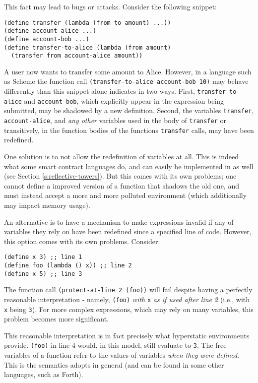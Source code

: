 This fact may lead to bugs or attacks. Consider the following snippet:

\begin{verbatim}
(define transfer (lambda (from to amount) ...))
(define account-alice ...)
(define account-bob ...)
(define transfer-to-alice (lambda (from amount)
  (transfer from account-alice amount))
\end{verbatim}

A user now wants to transfer some amount to Alice. However, in a language such
as Scheme the function call \texttt{(transfer-to-alice account-bob 10)} may
behave differently than this snippet alone indicates in two ways. First,
\texttt{transfer-to-alice} and \texttt{account-bob}, which explicitly appear in
the expression being submitted, may be shadowed by a new definition. Second,
the variables \texttt{transfer}, \texttt{account-alice}, and \emph{any other}
variables used in the body of \texttt{transfer} or transitively, in the
function bodies of the functions \texttt{transfer} calls, may have been
redefined.

One solution is to not allow the redefinition of variables at all. This is
indeed what some smart contract languages do, and can easily be implemented in \rad
as well (see Section \ref{s:reflective-towers}). But this comes with its own
problems; one cannot define a improved version of a function that shadows the
old one, and must instead accept a more and more polluted environment (which
additionally may impact memory usage).

An alternative is to have a mechanism to make expressions invalid if any of
variables they rely on have been redefined since a specified line of code.
However, this option comes with its own problems. Consider:

\begin{verbatim}
(define x 3) ;; line 1
(define foo (lambda () x)) ;; line 2
(define x 5) ;; line 3
\end{verbatim}

The function call \texttt{(protect-at-line 2 (foo))} will fail despite having a
perfectly reasonable interpretation - namely, \texttt{(foo)} \emph{with}
\texttt{x} \emph{as if used after line 2} (i.e., with \texttt{x} being
\texttt{3}). For more complex expressions, which may rely on many variables,
this problem becomes more significant.

This reasonable interpretation is in fact precisely what hyperstatic
environments provide. \texttt{(foo)} in line 4 would, in this model, still
evaluate to \texttt{3}. The free variables of a function refer to the values of
variables \emph{when they were defined}. This is the semantics \rad adopts in
general (and can be found in some other languages, such as Forth).

